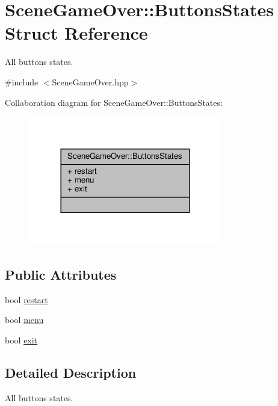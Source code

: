 \hypertarget{struct_scene_game_over_1_1_buttons_states}{}\section{Scene\+Game\+Over\+:\+:Buttons\+States Struct Reference}
\label{struct_scene_game_over_1_1_buttons_states}


All buttons states.  




{\ttfamily \#include $<$Scene\+Game\+Over.\+hpp$>$}



Collaboration diagram for Scene\+Game\+Over\+:\+:Buttons\+States\+:
\nopagebreak
\begin{figure}[H]
\begin{center}
\leavevmode
\includegraphics[width=240pt]{struct_scene_game_over_1_1_buttons_states__coll__graph}
\end{center}
\end{figure}
\subsection*{Public Attributes}
\begin{DoxyCompactItemize}
\item 
bool \hyperlink{struct_scene_game_over_1_1_buttons_states_afc64da074de682be7f40ba241d41728e}{restart}
\item 
bool \hyperlink{struct_scene_game_over_1_1_buttons_states_a3cec246cce96410ef3860b9af81347b3}{menu}
\item 
bool \hyperlink{struct_scene_game_over_1_1_buttons_states_a32b0d6225b1fdbe9f27359c528e58811}{exit}
\end{DoxyCompactItemize}


\subsection{Detailed Description}
All buttons states. 

